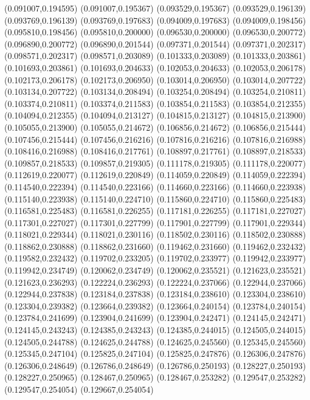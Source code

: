 (0.091007,0.194595)
(0.091007,0.195367)
(0.093529,0.195367)
(0.093529,0.196139)
(0.093769,0.196139)
(0.093769,0.197683)
(0.094009,0.197683)
(0.094009,0.198456)
(0.095810,0.198456)
(0.095810,0.200000)
(0.096530,0.200000)
(0.096530,0.200772)
(0.096890,0.200772)
(0.096890,0.201544)
(0.097371,0.201544)
(0.097371,0.202317)
(0.098571,0.202317)
(0.098571,0.203089)
(0.101333,0.203089)
(0.101333,0.203861)
(0.101693,0.203861)
(0.101693,0.204633)
(0.102053,0.204633)
(0.102053,0.206178)
(0.102173,0.206178)
(0.102173,0.206950)
(0.103014,0.206950)
(0.103014,0.207722)
(0.103134,0.207722)
(0.103134,0.208494)
(0.103254,0.208494)
(0.103254,0.210811)
(0.103374,0.210811)
(0.103374,0.211583)
(0.103854,0.211583)
(0.103854,0.212355)
(0.104094,0.212355)
(0.104094,0.213127)
(0.104815,0.213127)
(0.104815,0.213900)
(0.105055,0.213900)
(0.105055,0.214672)
(0.106856,0.214672)
(0.106856,0.215444)
(0.107456,0.215444)
(0.107456,0.216216)
(0.107816,0.216216)
(0.107816,0.216988)
(0.108416,0.216988)
(0.108416,0.217761)
(0.108897,0.217761)
(0.108897,0.218533)
(0.109857,0.218533)
(0.109857,0.219305)
(0.111178,0.219305)
(0.111178,0.220077)
(0.112619,0.220077)
(0.112619,0.220849)
(0.114059,0.220849)
(0.114059,0.222394)
(0.114540,0.222394)
(0.114540,0.223166)
(0.114660,0.223166)
(0.114660,0.223938)
(0.115140,0.223938)
(0.115140,0.224710)
(0.115860,0.224710)
(0.115860,0.225483)
(0.116581,0.225483)
(0.116581,0.226255)
(0.117181,0.226255)
(0.117181,0.227027)
(0.117301,0.227027)
(0.117301,0.227799)
(0.117901,0.227799)
(0.117901,0.229344)
(0.118021,0.229344)
(0.118021,0.230116)
(0.118502,0.230116)
(0.118502,0.230888)
(0.118862,0.230888)
(0.118862,0.231660)
(0.119462,0.231660)
(0.119462,0.232432)
(0.119582,0.232432)
(0.119702,0.233205)
(0.119702,0.233977)
(0.119942,0.233977)
(0.119942,0.234749)
(0.120062,0.234749)
(0.120062,0.235521)
(0.121623,0.235521)
(0.121623,0.236293)
(0.122224,0.236293)
(0.122224,0.237066)
(0.122944,0.237066)
(0.122944,0.237838)
(0.123184,0.237838)
(0.123184,0.238610)
(0.123304,0.238610)
(0.123304,0.239382)
(0.123664,0.239382)
(0.123664,0.240154)
(0.123784,0.240154)
(0.123784,0.241699)
(0.123904,0.241699)
(0.123904,0.242471)
(0.124145,0.242471)
(0.124145,0.243243)
(0.124385,0.243243)
(0.124385,0.244015)
(0.124505,0.244015)
(0.124505,0.244788)
(0.124625,0.244788)
(0.124625,0.245560)
(0.125345,0.245560)
(0.125345,0.247104)
(0.125825,0.247104)
(0.125825,0.247876)
(0.126306,0.247876)
(0.126306,0.248649)
(0.126786,0.248649)
(0.126786,0.250193)
(0.128227,0.250193)
(0.128227,0.250965)
(0.128467,0.250965)
(0.128467,0.253282)
(0.129547,0.253282)
(0.129547,0.254054)
(0.129667,0.254054)
